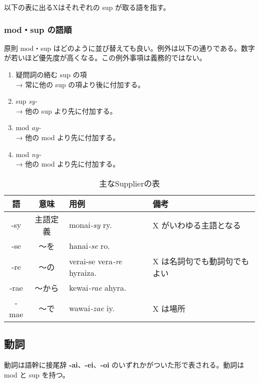 以下の表に出るXはそれぞれの sup が取る語を指す。

\subsubsection{mod・sup の語順}

原則 mod・sup はどのように並び替えても良い。例外は以下の通りである。数字が若いほど優先度が高くなる。この例外事項は義務的ではない。

\begin{enumerate}
    \item 疑問詞の絡む sup の項 \\ → 常に他の sup の項より後に付加する。
    \item sup \emph{sy-} \\ → 他の sup より先に付加する。
    \item mod \emph{ay-} \\ → 他の mod より先に付加する。
    \item mod \emph{ny-} \\ → 他の mod より先に付加する。
\end{enumerate}

\begin{table}[h]
    \centering
    \caption{主なSupplierの表}
    \begin{tabular}{ccll}
        \hline
        語 & 意味 & 用例 & 備考 \\
        \hline \hline
        -sy  & 主語定義 & monai\emph{-sy} ry.             & X がいわゆる主語となる \\
        -se  & ～を & hanai\emph{-se} ro.                 & \\
        -re  & ～の & verai-se vera\emph{-re} hyraiza.   & X は名詞句でも動詞句でもよい \\
        -rae & ～から & kewai\emph{-rae} ahyra.            & \\
        -mae & ～で & wawai\emph{-zae} iy.                 & X は場所 \\
        \hline
    \end{tabular}
\end{table}

\clearpage

\subsection{動詞}

動詞は語幹に接尾辞 \textbf{-ai}、\textbf{-ei}、\textbf{-oi} のいずれかがついた形で表される。動詞は mod と sup を持つ。

